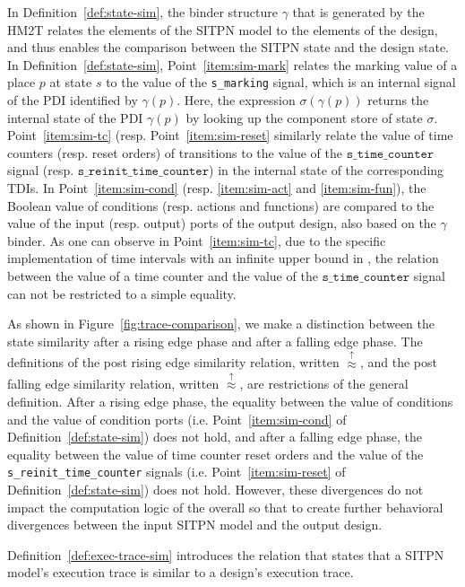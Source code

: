 In Definition~\ref{def:state-sim}, the binder structure $\gamma$ that
is generated by the HM2T relates the elements of the SITPN model to
the elements of the \hvhdl{} design, and thus enables the comparison
between the SITPN state and the design state. In
Definition~\ref{def:state-sim}, Point~\ref{item:sim-mark} relates the
marking value of a place $p$ at state $s$ to the value of the
\texttt{s\_marking} signal, which is an internal signal of the PDI
identified by $\gamma(p)$. Here, the expression $\sigma(\gamma(p))$
returns the internal state of the PDI $\gamma(p)$ by looking up the
component store of state $\sigma$. Point~\ref{item:sim-tc} (resp.
Point~\ref{item:sim-reset} similarly relate the value of time counters
(resp. reset orders) of transitions to the value of the
$\texttt{s\_time\_counter}$ signal
(resp. $\texttt{s\_reinit\_time\_counter}$) in the internal state of
the corresponding TDIs. In Point~\ref{item:sim-cond}
(resp. \ref{item:sim-act} and \ref{item:sim-fun}), the Boolean value
of conditions (resp. actions and functions) are compared to the value
of the input (resp. output) ports of the output design, also based on
the $\gamma$ binder.  As one can observe in Point~\ref{item:sim-tc},
due to the specific implementation of time intervals with an infinite
upper bound in \hvhdl{}, the relation between the value of a time
counter and the value of the $\texttt{s\_time\_counter}$ signal can
not be restricted to a simple equality.

As shown in Figure~\ref{fig:trace-comparison}, we make a distinction
between the state similarity after a rising edge phase and after a
falling edge phase. The definitions of the post rising edge similarity
relation, written $\stackrel{\uparrow}{\approx}$, and the post falling
edge similarity relation, written $\stackrel{\uparrow}{\approx}$, are
restrictions of the general definition. After a rising edge phase, the
equality between the value of conditions and the value of condition
ports (i.e. Point~\ref{item:sim-cond} of
Definition~\ref{def:state-sim}) does not hold, and after a falling
edge phase, the equality between the value of time counter reset
orders and the value of the \texttt{s\_reinit\_time\_counter} signals
(i.e. Point~\ref{item:sim-reset} of Definition~\ref{def:state-sim})
does not hold. However, these divergences do not impact the
computation logic of the overall so that to create further behavioral
divergences between the input SITPN model and the output \hvhdl{}
design.

Definition~\ref{def:exec-trace-sim} introduces the relation that
states that a SITPN model's execution trace is similar to a \hvhdl{}
design's execution trace.

